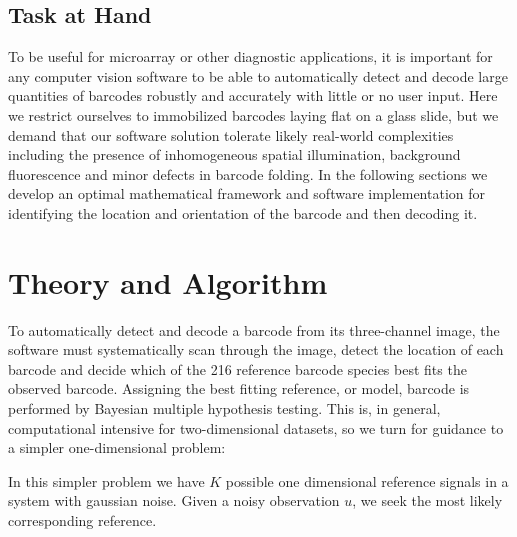 \subsection{Task at Hand}
To be useful for microarray or other diagnostic applications, it is important for any computer vision software to be able to automatically detect and decode large quantities of barcodes robustly and accurately with little or no user input. 
Here we restrict ourselves to immobilized barcodes laying flat on a glass slide, but we demand that our software solution tolerate  likely real-world complexities including the presence of inhomogeneous spatial illumination, background fluorescence and minor defects in barcode folding.  
In the following sections we develop an optimal mathematical framework and software implementation for identifying the location and orientation of the barcode and then decoding it.


\section{Theory and Algorithm}
To automatically detect and decode a barcode from its three-channel image, the software must systematically scan through the image, detect the location of each barcode and decide which of the 216 reference barcode species best fits the observed barcode. Assigning the best fitting reference, or model, barcode is performed by Bayesian multiple hypothesis testing. This is, in general, computational intensive for two-dimensional datasets, so we turn for guidance to a simpler one-dimensional problem: 



In this simpler problem we have $K$ possible one dimensional reference signals in a system with gaussian noise.  Given a noisy observation $u$, we seek the most likely corresponding reference. 






